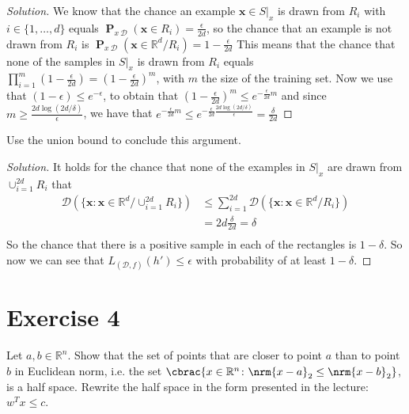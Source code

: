 \documentclass[10pt, a4paper, twoside]{amsart}
\newcommand{\R}{\ensuremath{\mathbb{R}}}
\DeclarePairedDelimiter\cbrac\{\}
\DeclarePairedDelimiter{\nrm}\lVert\rVert
\renewcommand{\c}{\ensuremath{\colon}}
\renewcommand{\P}{\operatorname*{\ensuremath{\mathbf{P}}}}
\newenvironment{solution}
               {\let\oldqedsymbol=\qedsymbol
                \renewcommand{\qedsymbol}{$\blacktriangleleft$}
                \begin{proof}[Solution]}
               {\end{proof}
                \renewcommand{\qedsymbol}{\oldqedsymbol}}
\begin{document}
\begin{solution}
  We know that the chance an example $\mathbf{x} \in S|_x$ is drawn from $R_i$ with $i \in \{1,\ldots, d\}$ equals $\P_{x~\mathcal{D}}(\mathbf{x}\in R_i) = \frac{\epsilon}{2d}$, so the chance that an example is not drawn from $R_i$ is $\P_{x~\mathcal{D}}(\mathbf{x}\in \R^d/R_i) = 1-\frac{\epsilon}{2d}$ This means that the chance that none of the samples in $S|_x$ is drawn from $R_i$ equals $\prod_{i = 1}^m(1-\frac{\epsilon}{2d}) = (1-\frac{\epsilon}{2d})^m$, with $m$ the size of the training set. Now we use that $(1-\epsilon)\leq e^{-\epsilon}$, to obtain that $(1-\frac{\epsilon}{2d})^m \leq e^{- \frac{\epsilon}{2d}m}$ and since $m \geq \frac{2d\log (2d/\delta)}{\epsilon}$, we have that $e^{- \frac{\epsilon}{2d}m} \leq e^{-\frac{\epsilon}{2d}\frac{2d\log (2d/\delta)}{\epsilon}}= \frac{\delta}{2d}$
\end{solution}
Use the union bound to conclude this argument. \\
\begin{solution}
  It holds for the chance that none of the examples in $S|_x$ are drawn from $\cup_{i=1}^{2d} R_i$  that
\begin{align*}
  \mathcal{D}(\{\mathbf{x}:\mathbf{x}\in \R^d/\cup_{i=1}^{2d} R_i\}) & \leq \sum_{i=1}^{2d} \mathcal{D}(\{\mathbf{x}:\mathbf{x}\in \R^d/R_i\}) \\
                                                                                 & = 2d\frac{\delta}{2d} = \delta \\
\end{align*}
So the chance that there is a positive sample in each of the rectangles is $1-\delta$. So now we can see that $L_{(\mathcal{D},f)}(h')\leq \epsilon$ with probability of at least $1 - \delta$.
\end{solution}

\section*{Exercise 4}
Let $a, b \in \R^n$. 
Show that the set of points that are closer to point $a$ than to point $b$ in Euclidean norm, 
i.e. the set $\cbrac{x \in \R^n \c \nrm{x-a}_2 \leq \nrm{x-b}_2}$, is a half space. 
Rewrite the half space in the form presented in the lecture: $w^T x \leq c$.
\end{document}
